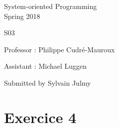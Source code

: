 \documentclass[a4paper,11pt]{report}
\author{Sylvain Julmy}
\date{\today}
\begin{document}
\begin{center}
  \Large{
    System-oriented Programming\\
    Spring 2018
  }
  
  \noindent\makebox[\linewidth]{\rule{\linewidth}{0.4pt}}
  S03
  \noindent\makebox[\linewidth]{\rule{\linewidth}{0.4pt}}

  \begin{flushleft}
    Professor : Philippe Cudré-Mauroux

    Assistant : Michael Luggen
  \end{flushleft}
  
  \noindent\makebox[\linewidth]{\rule{\linewidth}{0.4pt}}

  Submitted by Sylvain Julmy
  
  \noindent\makebox[\linewidth]{\rule{\textwidth}{1pt}}
\end{center}

\section*{Exercice 4}
\end{document}
